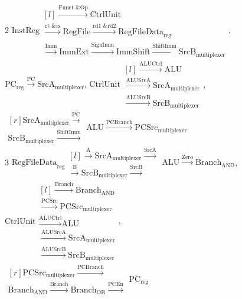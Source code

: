 \documentclass{article}
\begin{document}
\begin{enumerate}
\begin{enumerate}
2 $\text{InstReg} \begin{matrix*}[l] 
\xrightarrow{\text{Funct \& Op}} \text{CtrlUnit} \\ \xrightarrow{\text{rt \& rs}} \text{RegFile} \xrightarrow{\text{rd1 \& rd2}} \text{RegFileData}_\text{reg}\\
\xrightarrow{\text{Imm}} \text{ImmExt} \xrightarrow{\text{SignImm}} \text{ImmShift} \xrightarrow{\text{ShiftImm}} \text{SrcB}_\text{multiplexer} \end{matrix*}$, $\text{PC}_\text{reg} \xrightarrow{\text{PC}} \text{SrcA}_\text{multiplexer}$,
\smallbreak
$\text{CtrlUnit} \begin{matrix*}[l] 
\xrightarrow{\text{ALUCtrl}} \text{ALU} \\ \xrightarrow{\text{ALUSrcA}} \text{SrcA}_\text{multiplexer} \\ \xrightarrow{\text{ALUSrcB}} \text{SrcB}_\text{multiplexer} \end{matrix*}$, $\begin{matrix*}[r] \text{SrcA}_\text{multiplexer} \xrightarrow{\text{PC}} \\  \text{SrcB}_\text{multiplexer} \xrightarrow{\text{ShiftImm}}\end{matrix*} \text{ALU} \xrightarrow{\text{PCBranch}} \text{PCSrc}_\text{multiplexer}$\\

3 $\text{RegFileData}_\text{reg} \begin{matrix*}[l] \xrightarrow{\text{A}} \text{SrcA}_\text{multiplexer} \xrightarrow{\text{SrcA}} \\ \xrightarrow{\text{B}} \text{SrcB}_\text{multiplexer} \xrightarrow{\text{SrcB}} \end{matrix*} \text{ALU} \xrightarrow{\text{Zero}} \text{Branch}_\text{AND}$, $\text{CtrlUnit} \begin{matrix*}[l] \xrightarrow{\text{Branch}} \text{Branch}_\text{AND} \\ \xrightarrow{\text{PCSrc}} \text{PCSrc}_\text{multiplexer} \\
\xrightarrow{\text{ALUCtrl}} \text{ALU} \\ \xrightarrow{\text{ALUSrcA}} \text{SrcA}_\text{multiplexer} \\ \xrightarrow{\text{ALUSrcB}} \text{SrcB}_\text{multiplexer} \end{matrix*}$,\\
$\begin{matrix*}[r] \text{PCSrc}_\text{multiplexer} \xrightarrow{\text{PCBranch}} \\  \text{Branch}_\text{AND} \xrightarrow{\text{Branch}} \text{Branch}_\text{OR} \xrightarrow{\text{PCEn}}\end{matrix*} \text{PC}_\text{reg}$


\end{enumerate}
\end{enumerate}
\end{document}
